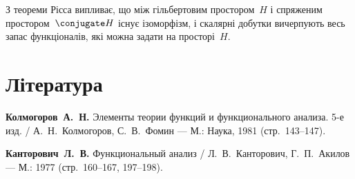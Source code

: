\begin{remark}
З теореми Рісса випливає, що
між гільбертовим простором~$H$
і спряженим простором~$\conjugate H$
існує ізоморфізм,
і скалярні добутки вичерпують
весь запас функціоналів,
які можна задати на просторі~$H$.
\end{remark}

\section{Література}

\begin{enumerate}[label={[\arabic*]}]
\item \textbf{Колмогоров~А.~Н.}
Элементы теории функций и функционального анализа. 5-е изд. /
А.~Н.~Колмогоров, С.~В.~Фомин ---
М.: Наука, 1981 (стр.~143--147).
\item \textbf{Канторович~Л.~В.}
Функциональный анализ /
Л.~В.~Канторович, Г.~П.~Акилов ---
М.: 1977 (стр.~160--167, 197--198).
\end{enumerate}

